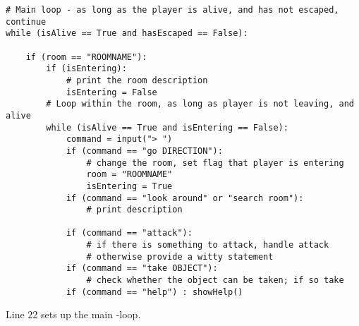 \begin{lstlisting}[firstnumber=last]
# Main loop - as long as the player is alive, and has not escaped, continue
while (isAlive == True and hasEscaped == False):

    if (room == "ROOMNAME"):
        if (isEntering):
            # print the room description
            isEntering = False
        # Loop within the room, as long as player is not leaving, and alive    
        while (isAlive == True and isEntering == False):
            command = input("> ")
            if (command == "go DIRECTION"):
                # change the room, set flag that player is entering
                room = "ROOMNAME"
                isEntering = True
            if (command == "look around" or "search room"):
                # print description

            if (command == "attack"):
                # if there is something to attack, handle attack
                # otherwise provide a witty statement
            if (command == "take OBJECT"):
                # check whether the object can be taken; if so take
            if (command == "help") : showHelp()
\end{lstlisting}

Line 22 sets up the main \whileloop-loop. 





 
 













   
